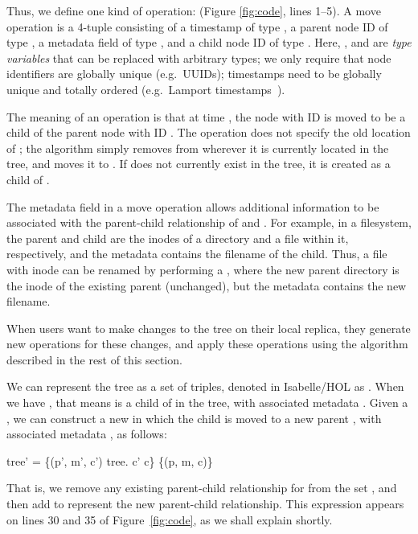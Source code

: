 \documentclass[10pt,journal,compsoc]{IEEEtran}
\renewenvironment{isabelle}{%
  \medbreak\indent%
  \renewcommand{\isanewline}{\\}%
  \begin{minipage}{\columnwidth}%
  \begin{isabellebody}%
  \begin{tabbing}%
}{%
  \end{tabbing}%
  \end{isabellebody}%
  \end{minipage}%
  \medbreak%
}
\begin{document}
Thus, we define one kind of operation:  (Figure \ref{fig:code}, lines 1--5).
A move operation is a 4-tuple consisting of a timestamp  of type , a parent node ID  of type , a metadata field  of type , and a child node ID  of type .
Here, ,  and  are \emph{type variables} that can be replaced with arbitrary types; we only require that node identifiers  are globally unique (e.g.\ UUIDs); timestamps  need to be globally unique and totally ordered (e.g.\ Lamport timestamps~\cite{Lamport:1978jq}).

The meaning of an operation  is that at time , the node with ID  is moved to be a child of the parent node with ID .
The operation does not specify the old location of ; the algorithm simply removes  from wherever it is currently located in the tree, and moves it to .
If  does not currently exist in the tree, it is created as a child of .

The metadata field  in a move operation allows additional information to be associated with the parent-child relationship of  and .
For example, in a filesystem, the parent and child are the inodes of a directory and a file within it, respectively, and the metadata contains the filename of the child.
Thus, a file with inode  can be renamed by performing a , where the new parent directory  is the inode of the existing parent (unchanged), but the metadata  contains the new filename.

When users want to make changes to the tree on their local replica, they generate new  operations for these changes, and apply these operations using the algorithm described in the rest of this section.

We can represent the tree as a set of  triples, denoted in Isabelle/HOL as .
When we have , that means  is a child of  in the tree, with associated metadata .
Given a , we can construct a new  in which the child  is moved to a new parent , with associated metadata , as follows:
\begin{isabelle}
tree' = \{(p', m', c') {\isasymin} tree. c' {\isasymnoteq} c\} {\isasymunion} \{(p, m, c)\}
\end{isabelle}
That is, we remove any existing parent-child relationship for  from the set , and then add  to represent the new parent-child relationship.
This expression appears on lines 30 and 35 of Figure~\ref{fig:code}, as we shall explain shortly.
\end{document}
